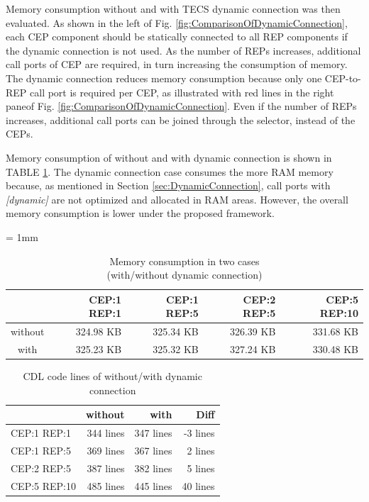 \documentclass[JIP]{ipsj_v2/UTF8/ipsj}
\begin{document}
Memory consumption without and with TECS dynamic connection was then evaluated.
As shown in the left of Fig. \ref{fig:ComparisonOfDynamicConnection}, each CEP component should be statically connected to all REP components if the dynamic connection is not used.
As the number of REPs increases, additional call ports of CEP are required, in turn increasing the consumption of memory. 
The dynamic connection reduces memory consumption because only one CEP-to-REP call port is required per CEP, as illustrated with red lines in the right paneof Fig. \ref{fig:ComparisonOfDynamicConnection}.
Even if the number of REPs increases, additional call ports can be joined through the selector, instead of the CEPs.

Memory consumption of without and with dynamic connection is shown in TABLE \ref{fig:EvaluationOfDynamicConnection}.
The dynamic connection case consumes the more RAM memory because, as mentioned in Section \ref{sec:DynamicConnection}, call ports with {\it [dynamic]} are not optimized and allocated in RAM areas.
However, the overall memory consumption is lower under the proposed framework.

\begin{table}[t]
    \centering
    \caption{Memory consumption in two cases\\(with/without dynamic connection)}
    {\tabcolsep = 1mm
    \begin{tabular}{c|r|r|r|r}
        \hline\hline
                &  CEP:1 REP:1 & CEP:1 REP:5 & CEP:2 REP:5 & CEP:5 REP:10 \\ \hline
        without &  324.98 KB   & 325.34 KB   & 326.39 KB   & 331.68 KB   \\
        with    &  325.23 KB   & 325.32 KB   & 327.24 KB   & 330.48 KB   \\
        \hline
    \end{tabular}
    }
    \label{fig:EvaluationOfDynamicConnection}
\end{table}

\begin{table}[t]
    \centering
    \caption{CDL code lines of without/with dynamic connection}
    \begin{tabular}{l|r|r|r}
        \hline\hline
                     &  without  &  with  &  Diff  \\ \hline
        CEP:1 REP:1  &  344 lines     &  347 lines  &  -3 lines   \\
        CEP:1 REP:5  &  369 lines     &  367 lines  &   2 lines   \\
        CEP:2 REP:5  &  387 lines     &  382 lines  &   5 lines   \\
        CEP:5 REP:10 &  485 lines     &  445 lines  &  40 lines   \\
        \hline
    \end{tabular}
    \label{tab:EvaluationOfConfigurabilityByDynamicConnection}
\end{table}
\end{document}

